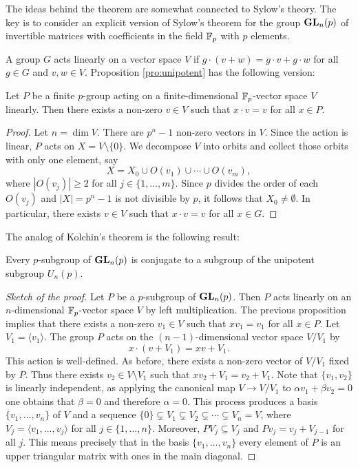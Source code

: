 The ideas behind the theorem are somewhat connected to Sylow's theory. The key is to consider an explicit version of Sylow's theorem for the group $\mathbf{GL}_n(p)$ of invertible matrices 
with coefficients in the field $\mathbb{F}_p$ with $p$ elements. 

A group $G$ acts linearly on a vector space $V$ 
if $g\cdot (v+w)=g\cdot v+g\cdot w$
for all $g\in G$ and $v,w\in V$.
Proposition \ref{pro:unipotent} has the following
version:

\begin{proposition}
Let $P$ be a finite $p$-group acting on a finite-dimensional $\mathbb{F}_p$-vector space 
$V$ linearly. Then there exists a non-zero $v\in V$ 
such that $x\cdot v=v$ for all $x\in P$. 
\end{proposition}

\begin{proof}
    Let $n=\dim V$. There are $p^n-1$ non-zero vectors 
    in $V$. Since the action is linear, 
    $P$ acts  
    on $X=V\setminus\{0\}$. We decompose $V$ into orbits
    and collect those orbits with only one element, say 
    \[
    X=X_0\cup O(v_1)\cup \cdots\cup O(v_m),
    \]
    where $|O(v_j)|\geq 2$ for all $j\in\{1,\dots,m\}$. 
    Since 
    $p$ divides the order of each $O(v_j)$ and 
    $|X|=p^n-1$ is not divisible by $p$, 
    it follows that $X_0\ne\emptyset$. In particular, 
    there exists $v\in V$ such that $x\cdot v=v$ for
    all $x\in G$. 
\end{proof}

The analog of Kolchin's theorem is the following result:

\begin{proposition}
\label{pro:Kolchin}
    Every $p$-subgroup of $\mathbf{GL}_n(p)$ is conjugate to a subgroup
    of the unipotent subgroup $U_n(p)$. 
\end{proposition}

\begin{proof}[Sketch of the proof]
    Let $P$ be a $p$-subgroup of $\mathbf{GL}_n(p)$. 
    Then $P$ acts linearly on an $n$-dimensional 
    $\mathbb{F}_p$-vector space $V$ by left multiplication. 
    The previous
    proposition implies that there exists a non-zero
    $v_1\in V$
    such that $xv_1=v_1$ for all $x\in P$. Let 
    $V_1=\langle v_1\rangle$. The group $P$ 
    acts on the $(n-1)$-dimensional vector space 
    $V/V_1$ by 
    \[
    x\cdot (v+V_1)=xv+V_1.
    \]
    This action is well-defined. 
    As before, there exists a non-zero 
    vector of $V/V_1$ fixed by $P$. Thus 
    there exists $v_2\in V\setminus V_1$ such that 
    $xv_2+V_1=v_2+V_1$. Note that $\{v_1,v_2\}$ is linearly
    independent, as applying the canonical
    map $V\to V/V_1$ to 
    $\alpha v_1+\beta v_2=0$ one obtains
    that $\beta=0$ and therefore $\alpha=0$. This process
    produces a basis $\{v_1,\dots,v_n\}$ 
    of $V$ and a sequence $\{0\}\subsetneq V_1\subsetneq V_2\subsetneq\cdots\subsetneq V_n=V$, where 
    $V_j=\langle v_1,\dots,v_j\rangle$ for all $j\in\{1,\dots,n\}$. Moreover,  
    $PV_j\subseteq V_j$  and 
    $Pv_j=v_j+V_{j-1}$ for all $j$. This
    means precisely that in the basis 
    $\{v_1,\dots,v_n\}$ 
    every element of $P$ is an upper triangular
    matrix with ones in the main diagonal. 
\end{proof}

